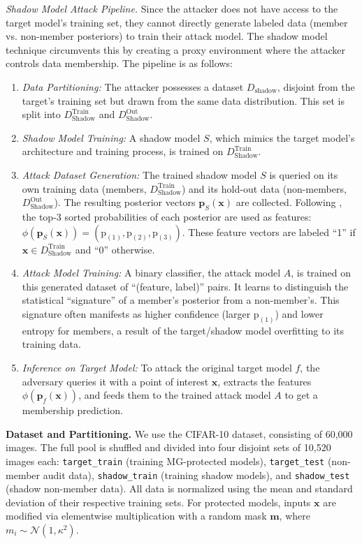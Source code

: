 \documentclass[10pt]{article} %
\theoremstyle{definition}
\theoremstyle{plain}
\begin{document}
\noindent\textit{Shadow Model Attack Pipeline.} Since the attacker does not have access to the target model's training set, they cannot directly generate labeled data (member vs. non-member posteriors) to train their attack model. The shadow model technique circumvents this by creating a proxy environment where the attacker controls data membership. The pipeline is as follows:
\begin{enumerate}[leftmargin=*]
    \item \textit{Data Partitioning:} The attacker possesses a dataset $D_{\text{shadow}}$, disjoint from the target's training set but drawn from the same data distribution. This set is split into $D^{\text{Train}}_{\text{Shadow}}$ and $D^{\text{Out}}_{\text{Shadow}}$.
    \item \textit{Shadow Model Training:} A shadow model $S$, which mimics the target model's architecture and training process, is trained on $D^{\text{Train}}_{\text{Shadow}}$.
    \item \textit{Attack Dataset Generation:} The trained shadow model $S$ is queried on its own training data (members, $D^{\text{Train}}_{\text{Shadow}}$) and its hold-out data (non-members, $D^{\text{Out}}_{\text{Shadow}}$). The resulting posterior vectors $\mathbf{p}_S(\mathbf{x})$ are collected. Following \citep{salem2019mlleaks}, the top-3 sorted probabilities of each posterior are used as features: $\phi(\mathbf{p}_S(\mathbf{x})) = (\text{p}_{(1)}, \text{p}_{(2)}, \text{p}_{(3)})$. These feature vectors are labeled ``1'' if $\mathbf{x} \in D^{\text{Train}}_{\text{Shadow}}$ and ``0'' otherwise.
    \item \textit{Attack Model Training:} A binary classifier, the attack model $A$, is trained on this generated dataset of ``(feature, label)'' pairs. It learns to distinguish the statistical ``signature'' of a member's posterior from a non-member's. This signature often manifests as higher confidence (larger $\text{p}_{(1)}$) and lower entropy for members, a result of the target/shadow model overfitting to its training data.
    \item \textit{Inference on Target Model:} To attack the original target model $f$, the adversary queries it with a point of interest $\mathbf{x}$, extracts the features $\phi(\mathbf{p}_f(\mathbf{x}))$, and feeds them to the trained attack model $A$ to get a membership prediction.
\end{enumerate}

\noindent \textbf{Dataset and Partitioning.} 
We use the CIFAR-10 dataset, consisting of 60,000 images. The full pool is shuffled and divided into four disjoint sets of 10,520 images each: \texttt{target\_train} (training MG-protected models), \texttt{target\_test} (non-member audit data), \texttt{shadow\_train} (training shadow models), and \texttt{shadow\_test} (shadow non-member data). All data is normalized using the mean and standard deviation of their respective training sets. For protected models, inputs $\mathbf{x}$ are modified via elementwise multiplication with a random mask $\mathbf{m}$, where $m_i \sim \mathcal{N}(1, \kappa^2)$.
\end{document}
